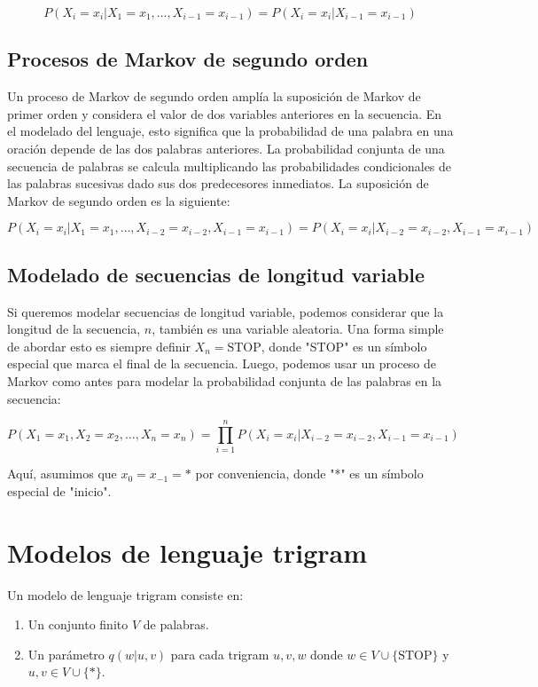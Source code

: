 \[
P(X_i = x_i|X_1 = x_1, \ldots, X_{i-1} = x_{i-1}) = P(X_i = x_i|X_{i-1} = x_{i-1})
\]

\subsection{Procesos de Markov de segundo orden}

Un proceso de Markov de segundo orden amplía la suposición de Markov de primer orden y considera el valor de dos variables anteriores en la secuencia. En el modelado del lenguaje, esto significa que la probabilidad de una palabra en una oración depende de las dos palabras anteriores. La probabilidad conjunta de una secuencia de palabras se calcula multiplicando las probabilidades condicionales de las palabras sucesivas dado sus dos predecesores inmediatos. La suposición de Markov de segundo orden es la siguiente:

\[
P(X_i = x_i|X_1 = x_1, \ldots, X_{i-2} = x_{i-2}, X_{i-1} = x_{i-1}) = P(X_i = x_i|X_{i-2} = x_{i-2}, X_{i-1} = x_{i-1})
\]

\subsection{Modelado de secuencias de longitud variable}

Si queremos modelar secuencias de longitud variable, podemos considerar que la longitud de la secuencia, $n$, también es una variable aleatoria. Una forma simple de abordar esto es siempre definir $X_n = \text{STOP}$, donde "STOP" es un símbolo especial que marca el final de la secuencia. Luego, podemos usar un proceso de Markov como antes para modelar la probabilidad conjunta de las palabras en la secuencia:

\[
P(X_1 = x_1, X_2 = x_2, \ldots, X_n = x_n) = \prod_{i=1}^{n} P(X_i = x_i|X_{i-2} = x_{i-2}, X_{i-1} = x_{i-1})
\]

Aquí, asumimos que $x_0 = x_{-1} = *$ por conveniencia, donde "*" es un símbolo especial de "inicio".

\section{Modelos de lenguaje trigram}

Un modelo de lenguaje trigram consiste en:

\begin{enumerate}
  \item Un conjunto finito $V$ de palabras.
  \item Un parámetro $q(w|u, v)$ para cada trigram $u, v, w$ donde $w \in V \cup \{\text{STOP}\}$ y $u, v \in V \cup \{*\}$.
\end{enumerate}

